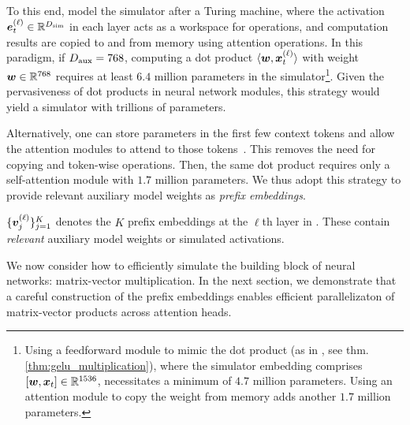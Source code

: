 To this end, \citet{wei2022statistically,perez2021attention} model the simulator after a Turing machine, where the activation $\ve_t^{(\ell)} \in\RR^{\simu{D}}$ in each layer acts as a workspace for operations, and computation results are copied to and from memory using attention operations.
In this paradigm, if $D_{\text{aux}} = 768$, computing a dot product $\langle {\bm{w}}, {\bm{x}}_t^{(\ell)}\rangle$ with weight ${\bm{w}}\in\mathbb{R}^{768}$ requires at least $6.4$ million parameters in the simulator\footnote{
Using a feedforward module to mimic the dot product (as in \citet{akyurek2022learning}, see thm. \ref{thm:gelu_multiplication}), where the simulator embedding comprises $[{\bm{w}}, {\bm{x}}_t] \in \mathbb{R}^{1536}$, necessitates a minimum of $4.7$ million parameters. Using an attention module to copy the weight from memory adds another $1.7$ million parameters.}.
Given the pervasiveness of dot products in neural network modules, this strategy would yield a simulator with trillions of parameters. 


Alternatively, one can store parameters in the first few context tokens and allow the attention modules to attend to those tokens~\citep{giannou2023looped}. 
This removes the need for copying and token-wise operations. 
Then, the same dot product requires only a self-attention module with $1.7$ million parameters.
We thus adopt this strategy to provide relevant auxiliary model weights as \emph{prefix embeddings}.
\begin{definition}
    $\{ {\bm{v}}_j^{(\ell)} \}_{j=1}^K$ denotes the $K$ prefix embeddings at the $\ell$th layer  in \simulator . These contain \emph{relevant} auxiliary model weights or simulated activations.
    \label{def:prefix_embs}
\end{definition}
We now consider how to efficiently simulate the building block of neural networks: matrix-vector multiplication.
In the next section, we demonstrate that a careful construction of the prefix embeddings enables efficient parallelizaton of matrix-vector products across attention heads.


